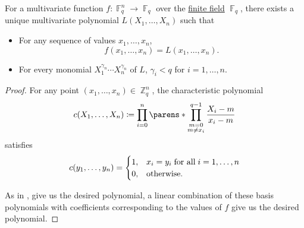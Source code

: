 \begin{theorem}\label{thm:finite_field_lagrange_interpolation}
  For a multivariate function \( f: \BbbF_q^n \to \BbbF_q \) over the \hyperref[def:finite_field]{finite field} \( \BbbF_q \), there exists a unique multivariate polynomial \( L(X_1, \ldots, X_n) \) such that
  \begin{itemize}
    \item For any sequence of values \( x_1, \ldots, x_n \),
    \begin{equation*}
      f(x_1, \ldots, x_n) = L(x_1, \ldots, x_n).
    \end{equation*}

    \item For every monomial \( X_1^{\gamma_n} \cdots X_n^{\gamma_n} \) of \( L \), \( \gamma_i < q \) for \( i = 1, \ldots, n \).
  \end{itemize}
\end{theorem}
\begin{proof}
  For any point \( (x_1, \ldots, x_n) \in \BbbZ_q^n \), the characteristic polynomial
  \begin{equation*}
    c(X_1, \ldots, X_n) \coloneqq \prod_{i=0}^n \parens*{ \prod_{\substack{m=0 \\ m \neq x_i}}^{q - 1} \frac {X_i - m} {x_i - m} }
  \end{equation*}
  satisfies
  \begin{equation*}
    c(y_1, \ldots, y_n) = \begin{cases}
      1, &x_i = y_i \T{for all} i = 1, \ldots, n \\
      0, &\T{otherwise.}
    \end{cases}
  \end{equation*}

  As in , give us the desired polynomial, a linear combination of these basis polynomials with coefficients corresponding to the values of \( f \) give us the desired polynomial.
\end{proof}
